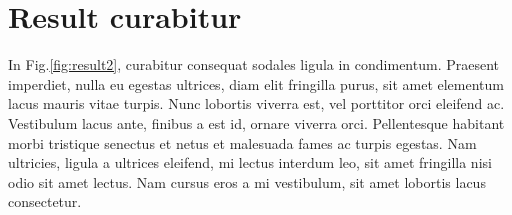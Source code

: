 \documentclass[11pt,oneside,openright]{book}
\begin{document}

\section{Result curabitur}

In Fig.\ref{fig:result2}, curabitur consequat sodales ligula in condimentum. Praesent imperdiet, nulla eu egestas ultrices, diam elit fringilla purus, sit amet elementum lacus mauris vitae turpis. Nunc lobortis viverra est, vel porttitor orci eleifend ac. Vestibulum lacus ante, finibus a est id, ornare viverra orci. Pellentesque habitant morbi tristique senectus et netus et malesuada fames ac turpis egestas. Nam ultricies, ligula a ultrices eleifend, mi lectus interdum leo, sit amet fringilla nisi odio sit amet lectus. Nam cursus eros a mi vestibulum, sit amet lobortis lacus consectetur.
\end{document}

